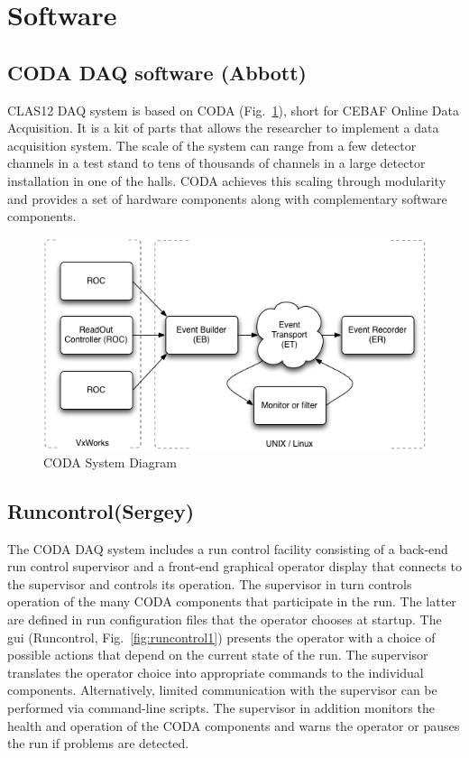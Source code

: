 \section{Software}

\subsection{CODA DAQ software (Abbott)}

CLAS12 DAQ system is based on CODA (Fig.~\ref{fig:coda_diagram}), short for CEBAF Online Data Acquisition. It is a kit of parts that allows the researcher to implement a data acquisition system. The scale of the system can range from a few detector channels in a test stand to tens of thousands of channels in a large detector installation in one of the halls. CODA achieves this scaling through modularity and provides a set of hardware components along with complementary software components.

\begin{figure}[hbt]
	\centering
	\includegraphics[width=1.0\columnwidth,keepaspectratio]{img/coda_diagram.png}
	\caption{CODA System Diagram}
	\label{fig:coda_diagram}
\end{figure}


\subsection {Runcontrol(Sergey)}

The CODA DAQ system includes a run control facility consisting of a back-end run control supervisor and a front-end graphical operator display that connects to the supervisor and controls its operation. The supervisor in turn controls operation of the many CODA components that participate in the run. The latter are defined in run configuration files that the operator chooses at startup. The gui (Runcontrol, Fig.~\ref{fig:runcontrol1}) presents the operator with a choice of possible actions that depend on the current state of the run. The supervisor translates the operator choice into appropriate commands to the individual components. Alternatively, limited communication with the supervisor can be performed via command-line scripts.
The supervisor in addition monitors the health and operation of the CODA components and warns the operator or pauses the run if problems are detected.

